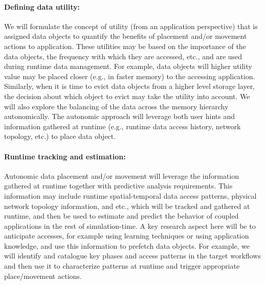 \paragraph{Defining data utility:} We will formulate the concept of utility (from an
application perspective) that is assigned data objects to quantify the
benefits of placement and/or movement actions to application. These
utilities may be based on the importance of the data objects, the frequency
with which they are accessed, etc., and are used during runtime data
management. For example, data objects will higher utility value may be
placed closer (e.g., in faster memory) to the accessing application.
Similarly, when it is time to evict data objects from a higher level storage
layer, the decision about which object to evict may take the utility into
account. We will also explore the balancing of the data across the memory
hierarchy autonomically. The autonomic approach will leverage both user
hints and information gathered at runtime (e.g., runtime data access
history, network topology, etc.) to place data object.

\paragraph{ Runtime tracking and estimation:}
Autonomic data placement and/or
movement will leverage the information gathered at runtime together with
predictive analysis requirements. This information may include runtime
spatial-temporal data access patterns, physical network topology
information, and etc., which will be tracked and gathered at runtime, and
then be used to estimate and predict the behavior of coupled applications in
the rest of simulation-time. A key research aspect here will be to
anticipate accesses, for example using learning techniques or using
application knowledge, and use this information to prefetch data objects.
For example, we will identify and catalogue key phases and access patterns
in the target workflows and then use it to characterize patterns at runtime
and trigger appropriate place/movement actions.

